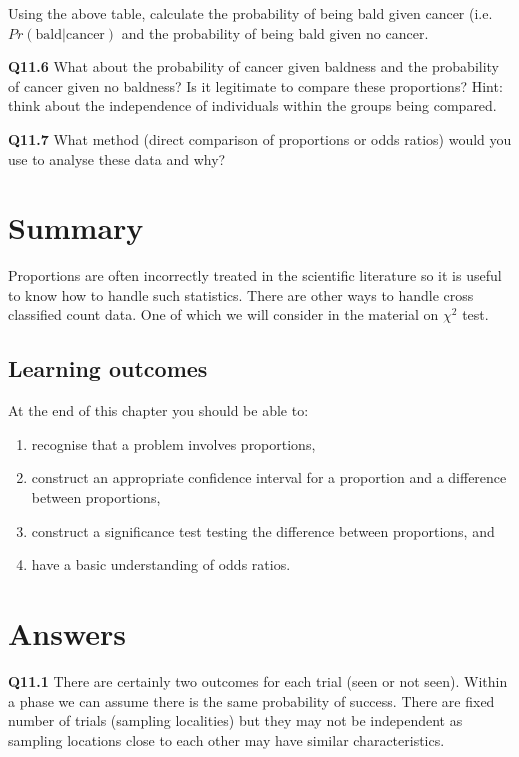 \documentclass[
  oneside]{krantz}
\providecommand{\tightlist}{%
  \setlength{\itemsep}{0pt}\setlength{\parskip}{0pt}}
\begin{document}
Using the above table, calculate the probability of being bald given cancer (i.e.~\(Pr(\textrm{bald|cancer})\) and the probability of being bald given no cancer.

\textbf{Q11.6} What about the probability of cancer given baldness and the probability of cancer given no baldness? Is it legitimate to compare these proportions? Hint: think about the independence of individuals within the groups being compared.

\textbf{Q11.7} What method (direct comparison of proportions or odds ratios) would you use to analyse these data and why?

\hypertarget{SUMprop}{%
\section{Summary}\label{SUMprop}}

Proportions are often incorrectly treated in the scientific literature so it is useful to know how to handle such statistics. There are other ways to handle cross classified count data. One of which we will consider in the material on \(\chi^{2}\) test.

\hypertarget{learning-outcomes-7}{%
\subsection{Learning outcomes}\label{learning-outcomes-7}}

At the end of this chapter you should be able to:

\begin{enumerate}
\def\labelenumi{\arabic{enumi}.}
\tightlist
\item
  recognise that a problem involves proportions,\\
\item
  construct an appropriate confidence interval for a proportion and a difference between proportions,\\
\item
  construct a significance test testing the difference between proportions, and
\item
  have a basic understanding of odds ratios.
\end{enumerate}

\hypertarget{ANSprop}{%
\section{Answers}\label{ANSprop}}

\textbf{Q11.1} There are certainly two outcomes for each trial (seen or not seen). Within a phase we can assume there is the same probability of success. There are fixed number of trials (sampling localities) but they may not be independent as sampling locations close to each other may have similar characteristics.
\end{document}
